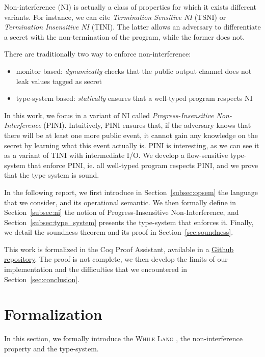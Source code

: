 \documentclass[10pt]{article}
\newcommand{\whilelang}{\textsc{While Lang} }
\begin{document}
Non-interference (NI) is actually a class of properties for which it exists different variants. For
instance, we can cite \emph{Termination Sensitive NI} (TSNI) or \emph{Termination Insensitive NI}
(TINI). The latter allows an adversary to differentiate a secret with the non-termination of the
program, while the former does not.

There are traditionally two way to enforce non-interference:
\begin{itemize}
  \item monitor based: \emph{dynamically} checks that the public output channel does not leak values
        tagged as secret
  \item type-system based: \emph{statically} ensures that a well-typed program respects NI
\end{itemize}

In this work, we focus in a variant of NI called \emph{Progress-Insensitive Non-Interference}
(PINI).
Intuitively, PINI ensures that, if the adversary knows that there will be at least one more public
event, it cannot gain any knowledge on the secret by learning what this event actually is. PINI is
interesting, as we can see it as a variant of TINI with intermediate I/O.
We develop a flow-sensitive type-system that enforce PINI, ie. all well-typed program respects PINI,
and we prove that the type system is sound.

In the following report, we first introduce in
Section~\ref{subsec:opsem} the language that we consider, and its operational semantic.
We then formally define in Section~\ref{subsec:ni} the notion of Progress-Insensitive
Non-Interference, and Section~\ref{subsec:type_system} presents the type-system that enforces it.
Finally, we detail the soundness theorem and its proof in Section~\ref{sec:soundness}.

This work is formalized in the Coq Proof Assistant, available in a
\href{https://github.com/BastienRousseau/flow-sensitive-PINI}{Github repository}.
The proof is not complete, we then develop the limits of our implementation and the difficulties
that we encountered in Section~\ref{sec:conclusion}.

\section{Formalization}
\label{sec:formalization}
In this section, we formally introduce the \whilelang, the non-interference property and the
type-system.
\end{document}
